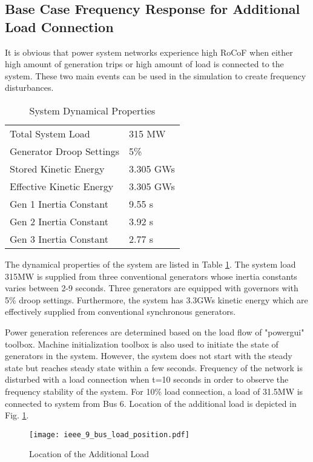 \subsection{Base Case Frequency Response for Additional Load Connection}
It is obvious that power system networks experience high RoCoF when either high amount of generation trips or high amount of load is connected to the system. These two main events can be used in the simulation to create frequency disturbances.\par
\begin{table}[h]
	\centering
	\begin{tabular}{ll}
		\hline
		Total System Load                      & 315 MW    \\
		Generator Droop Settings               & 5\%       \\
		Stored Kinetic Energy                  & 3.305 GWs \\
		Effective Kinetic Energy               & 3.305 GWs \\
		Gen 1 Inertia Constant                 & 9.55 s  \\
		Gen 2 Inertia Constant                 & 3.92 s  \\
		Gen 3 Inertia Constant                 & 2.77 s  \\ \hline
	\end{tabular}
	\caption{System Dynamical Properties}
	\label{systemdynamicaldata}
\end{table}
The dynamical properties of the system are listed in Table \ref{systemdynamicaldata}. The system load 315MW is supplied from three conventional generators whose inertia constants varies between 2-9 seconds. Three generators are equipped with governors with 5\% droop settings. Furthermore, the system has 3.3GWs kinetic energy which are effectively supplied from conventional synchronous generators. \par 
Power generation references are determined based on the load flow of "powergui" toolbox. Machine initialization toolbox is also used to initiate the state of generators in the system. However, the system does not start with the steady state but reaches steady state within a few seconds. Frequency of the network is disturbed with a load connection when t=10 seconds in order to observe the frequency stability of the system. For 10\% load connection, a load of 31.5MW is connected to system from Bus 6. Location of the additional load is depicted in Fig. \ref{ieee_9_bus_load}.\par
\begin{figure}[h]
	\centering
	\texttt{[image: ieee\_9\_bus\_load\_position.pdf]}
	\caption{Location of the Additional Load}
	\label{ieee_9_bus_load}
\end{figure}
